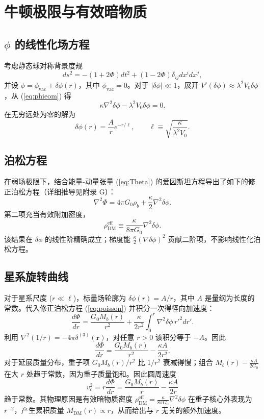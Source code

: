 \documentclass[12pt,a4paper]{article}
\begin{document}
	\section{牛顿极限与有效暗物质}
	
	\subsection{\(\phi\) 的线性化场方程}
	考虑静态球对称背景度规
	\[
	ds^2 = -(1+2\Phi)dt^2 + (1-2\Phi)\delta_{ij}dx^i dx^j,
	\]
	并设 \(\phi = \phi_{\mathrm{vac}} + \delta\phi(r)\)，其中 \(\phi_{\mathrm{vac}} = 0\)。对于 \(|\delta\phi| \ll 1\)，展开 \(V'(\delta\phi) \approx \lambda^2 V_0 \delta\phi\)，从 (\ref{eq:phieom}) 得
	\begin{equation}
		\kappa \nabla^2 \delta\phi - \lambda^2 V_0 \delta\phi = 0.
		\label{eq:lin-phi}
	\end{equation}
	在无穷远处为零的解为
	\begin{equation}
		\delta\phi(r) = \frac{A}{r} e^{-r/\ell}, \qquad \ell \equiv \sqrt{\frac{\kappa}{\lambda^2 V_0}}.
		\label{eq:deltaphi-sol}
	\end{equation}
	
	\subsection{泊松方程}
	在弱场极限下，结合能量-动量张量 (\ref{eq:Theta}) 的爱因斯坦方程导出了如下的修正泊松方程（详细推导见附录 G）：
	\begin{equation}
		\nabla^2 \Phi = 4\pi G_0 \rho_b + \frac{\kappa}{2} \nabla^2 \delta\phi.
		\label{eq:poisson}
	\end{equation}
	第二项充当有效附加密度，
	\begin{equation}
		\rho_{\mathrm{DM}}^{\mathrm{eff}} \equiv \frac{\kappa}{8\pi G_0} \nabla^2 \delta\phi.
		\label{eq:rhoDM}
	\end{equation}
	该结果在 \(\delta\phi\) 的线性阶精确成立；梯度能 \(\frac{\kappa}{2}(\nabla\delta\phi)^2\) 贡献二阶项，不影响线性化泊松方程。
	
	\subsection{星系旋转曲线}
	对于星系尺度 (\(r \ll \ell\))，标量场轮廓为 \(\delta\phi(r) = A/r\)，其中 \(A\) 是量纲为长度的常数。代入修正泊松方程 (\ref{eq:poisson}) 并积分一次得径向加速度：
	\[
	\frac{d\Phi}{dr} = \frac{G_0 M_b(r)}{r^2} + \frac{\kappa}{2r^2} \int_0^r \nabla^2\delta\phi \, r'^2 dr'.
	\]
	利用 \(\nabla^2(1/r) = -4\pi\delta^{(3)}(\mathbf{r})\)，对任意 \(r>0\) 该积分等于 \(-A\)。因此
	\[
	\frac{d\Phi}{dr} = \frac{G_0 M_b(r)}{r^2} - \frac{\kappa A}{2r^2}.
	\]
	对于延展质量分布，重子项 \(G_0 M_b(r)/r^2\) 比 \(1/r^2\) 衰减得慢；组合 \(M_b(r) - \frac{\kappa A}{2G_0}\) 在大 \(r\) 处趋于常数，因为重子质量饱和。因此圆周速度
	\[
	v_c^2 = r\frac{d\Phi}{dr} = \frac{G_0 M_b(r)}{r} - \frac{\kappa A}{2r}
	\]
	趋于常数。其物理原因是有效暗物质密度 \(\rho_{\mathrm{DM}}^{\mathrm{eff}} = \frac{\kappa}{8\pi G_0} \nabla^2\delta\phi\) 在重子核心外表现为 \(r^{-2}\)，产生累积质量 \(M_{\mathrm{DM}}(r) \propto r\)，从而给出与 \(r\) 无关的额外加速度。
	
\end{document}
